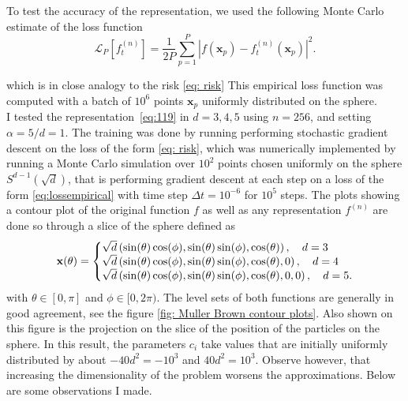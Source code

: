 \documentclass{article}
\begin{document}
 To test the accuracy of the
representation, we used the following Monte Carlo estimate of the loss
function
%
 \begin{equation}
   \label{eq:lossempirical}
   \mathcal{L}_P[f^{(n)}_t] = \frac{1}{2P} \sum_{p=1}^P \left|f(\mathbf{x}_p) - f^{(n)}_t(\mathbf{x}_p)\right|^2.
 \end{equation}

 which is in close analogy to the risk \ref{eq: risk}
 This empirical loss function was computed with a batch of $10^6$
 points $\mathbf{x}_p$ uniformly distributed on the sphere.\\

I tested the representation~\eqref{eq:119} in $d=3,4,5$ using $n=256$, and setting $\alpha = 5/d= 1$. The training was done
by running performing stochastic gradient descent on the loss of the form \ref{eq: risk}, which was numerically implemented by running a Monte Carlo simulation over $ 10^2$ points chosen uniformly on the sphere $ S^{d-1}(\sqrt{d})$, that is performing gradient descent at each step on a loss of the form \ref{eq:lossempirical} with
time step $\Delta t = 10^{-6}$ for $10^5$ steps. The plots
showing a contour plot of the original function $f$
as well as any representation $f^{(n)}$ are done so through a slice of the
sphere defined as
%
\begin{equation}
  \label{eq:slice}
  \mathbf{x}(\theta) =\left\lbrace
  \begin{array}{@{}l@{}}
       \sqrt{d} \left(\sin(\theta)\cos(\phi),
    \sin(\theta)\sin(\phi),
    \cos(\theta)\right), \quad d = 3\\
\sqrt{d} \left(\sin(\theta)\cos(\phi),
    \sin(\theta)\sin(\phi),
    \cos(\theta),0\right), \quad d = 4\\
      \sqrt{d} \left(\sin(\theta)\cos(\phi),
    \sin(\theta)\sin(\phi),
    \cos(\theta),0,0\right), \quad d = 5.
  \end{array}\right. 
\end{equation}%
with $\theta\in[0,\pi]$ and $\phi\in [0,2\pi)$. The level sets of both functions are generally in good agreement, see the figure \ref{fig: Muller Brown contour plots}. Also shown on
this figure is the projection on the slice of the position of the
particles on the sphere. In this result, the parameters $c_i$ take
values that are initially uniformly distributed by about
$-40 d^2 = -10^3$ and $40 d^2 = 10^3$. Observe however, that increasing the dimensionality of the problem worsens the approximations. Below are some observations I made.\\ 
\end{document}
